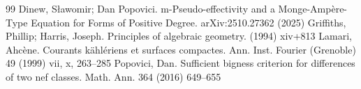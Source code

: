 \documentclass[10pt,a4paper]{amsart}
\numberwithin{equation}{section}
\begin{document}
\begin{thebibliography}{99}
 Dinew, S\l awomir; Dan Popovici. m-Pseudo-effectivity and a Monge-Ampère-Type Equation for Forms of Positive Degree. arXiv:2510.27362 (2025)
 Griffiths, Phillip; Harris, Joseph. Principles of algebraic geometry. (1994) xiv+813
 Lamari, Ahc\`ene. Courants k\"ahl\'eriens et surfaces compactes. Ann. Inst. Fourier (Grenoble) 49 (1999) vii, x, 263--285
 Popovici, Dan. Sufficient bigness criterion for differences of two nef classes. Math. Ann. 364 (2016) 649--655
\end{thebibliography}
\end{document}
